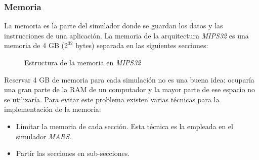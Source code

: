\subsubsection{Memoria}\label{subsubsec:memoria}

La memoria es la parte del simulador donde se guardan los datos
y las instrucciones de una aplicación.
La memoria de la arquitectura \textit{MIPS32} es una memoria de 4 GB
($2^{32}$ bytes) separada en las siguientes secciones:

\begin{figure}[H]
    \centering
    \caption{Estructura de la memoria en \textit{MIPS32}}
    \label{fig:memory-table}
\end{figure}

Reservar 4 GB de memoria para cada simulación no es una buena idea:
ocuparía una gran parte de la RAM de un computador y
la mayor parte de ese espacio no se utilizaría.
Para evitar este problema existen varias técnicas para la
implementación de la memoria:
\begin{itemize}
    \item Limitar la memoria de cada sección.
    Esta técnica es la empleada en el simulador \textit{MARS}.
    \item Partir las secciones en sub-secciones.
\end{itemize}

